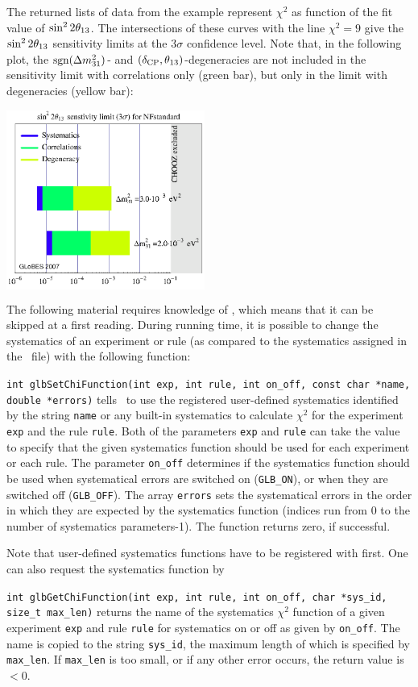 {The returned lists of data from the example represent $\chi^2$ 
as function of the fit value of $\sin^2 2 \theta_{13}$. The intersections of these
curves with the line $\chi^2 = 9$ give the $\sin^2 2 \theta_{13}$ sensitivity
limits at the $3 \sigma$ confidence level. Note that, in the following
plot, the $\mathrm{sgn}(\Delta m_{31}^2)$- and $(\delta_{\mathrm{CP}},\theta_{13})$-degeneracies
are not included in the sensitivity limit with correlations only (green bar),
but only in the limit with degeneracies (yellow bar):
\begin{center}
\colorbox{white}{\includegraphics[width=6.5cm]{barsex}}
\end{center}
}

The following material requires knowledge of \AEDL , which means that it can be skipped
at a first reading. 
%
During running time, it is possible to change the systematics of an experiment or
rule (as compared to the systematics assigned in the \AEDL\ file) with the following function:
\begin{function}
{\tt int glbSetChiFunction(int exp, int rule, int on\_off, const char *name, double *errors)}
 tells \GLOBES\ to use the registered user-defined systematics identified by the string {\tt name}
or any built-in systematics
to calculate $\chi^2$ for the experiment {\tt exp} and the rule {\tt rule}. 
Both of the parameters {\tt exp} and {\tt rule} can take the value  to specify that the
given systematics function should be used for each experiment or each rule. The parameter 
{\tt on\_off} determines if the systematics function should be used when systematical errors
are switched on ({\tt GLB\_ON}), or when they are switched off ({\tt GLB\_OFF}).
The array {\tt errors} sets the systematical errors in the order in which they
are expected by the systematics function (indices run from $0$ to
the number of systematics parameters-1). The function returns zero, if successful.
\end{function}
Note that user-defined systematics functions have to be registered with  first. 
One can also request the systematics function by 
\begin{function}
{\tt int glbGetChiFunction(int exp, int rule, int on\_off, char *sys\_id, size\_t max\_len)}
returns the name of the systematics $\chi^2$ function of a given experiment {\tt exp} and rule {\tt rule} for
systematics on or off as given by {\tt on\_off}. The name is copied to the string
{\tt sys\_id}, the maximum length of which is specified by {\tt max\_len}. If
{\tt max\_len} is too small, or if any other error occurs, the return value is $< 0$.
\end{function}

